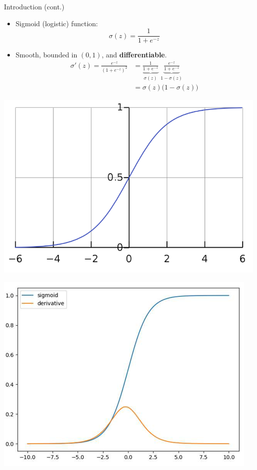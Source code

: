 \documentclass[serif, aspectratio=169]{beamer}
\begin{document}
\begin{frame}{Introduction (cont.)}
  \begin{minipage}{0.55\textwidth}
    \begin{itemize}
      \item Sigmoid (logistic) function:
      \[
        \sigma(z)=\frac{1}{1+e^{-z}}
      \]
      \item Smooth, bounded in $(0,1)$, and \textbf{differentiable}.
       \[
       \begin{aligned}
      \sigma'(z)=\frac{e^{-z}}{(1+e^{-z})^{2}}
      &=\underbrace{\frac{1}{1+e^{-z}}}_{\sigma(z)}\;
       \underbrace{\frac{e^{-z}}{1+e^{-z}}}_{1-\sigma(z)}
      \\ &=\sigma(z)\big(1-\sigma(z)\big)
      \end{aligned}
    \]
    \end{itemize}
   
  \end{minipage}\hfill
  \begin{minipage}{0.4\textwidth}
    \centering
    \includegraphics[width=0.8\linewidth]{pic/sigmoid.png}

    \vspace{0.5em}

    \includegraphics[width=0.8\linewidth]{pic/sigmoidDer.png}
  \end{minipage}
\end{frame}
\end{document}
